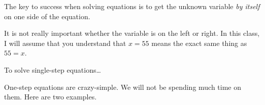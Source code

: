 The key to success when solving equations is to get the unknown variable \emph{by itself}
on one side of the equation.

\begin{center}
\begin{tcolorbox}[width=4in]
    It is not really important whether the variable is on the left or right.
    In this class, I will assume that you understand that
    $x=55$ means the exact same thing as $55=x$.
\end{tcolorbox}
\end{center}


\begin{myConceptSteps}{To solve single-step equations\dots}
\end{myConceptSteps}

One-step equations are crazy-simple.
We will not be spending much time on them.
Here are two examples.



